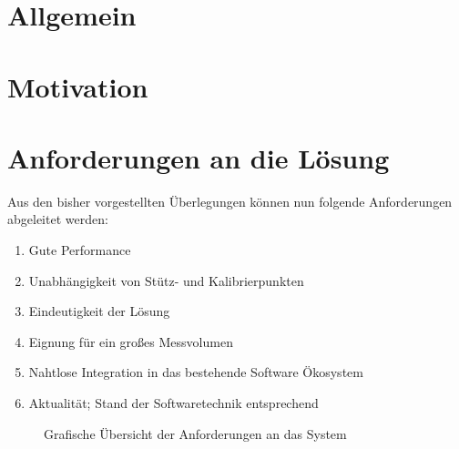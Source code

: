 %
\section[Allgemein]{Allgemein}

%
%
\section[Motivation]{Motivation}

%
%
\section[Anforderungen]{Anforderungen an die Lösung}
%
Aus den bisher vorgestellten Überlegungen können nun folgende Anforderungen abgeleitet werden:
%
\begin{enumerate}[itemsep=0mm]
	\item Gute Performance
	\item Unabhängigkeit von Stütz- und Kalibrierpunkten
	\item Eindeutigkeit der Lösung
	\item Eignung für ein großes Messvolumen
	\item Nahtlose Integration in das bestehende Software Ökosystem
	\item Aktualität; Stand der Softwaretechnik entsprechend
%
\end{enumerate}
%
\begin{figure}[ht!]
         \centering
         
         \caption[Anforderungsspinne]{ Grafische Übersicht der Anforderungen an das System }
         \label{fig:Requirements}
\end{figure}
%
%

